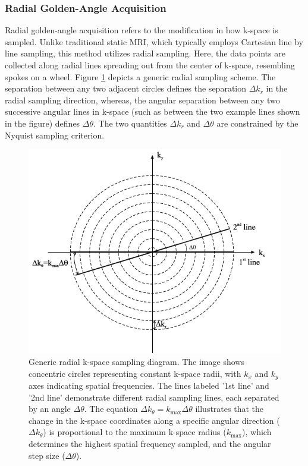\documentclass{micro-econ-thesis}
\begin{document}
\subsubsection{Radial Golden-Angle Acquisition}


Radial golden-angle acquisition refers to the modification in how k-space is sampled. Unlike traditional static MRI, which typically employs Cartesian line by line sampling, this method utilizes radial sampling. Here, the data points are collected along radial lines spreading out from the center of k-space, resembling spokes on a wheel. Figure \ref{fig:radial} depicts a generic radial sampling scheme. The separation between any two adjacent circles defines the separation $\Delta k_r$ in the radial sampling direction, whereas, the angular separation between any two successive angular lines in k-space (such as between the two example lines shown in the figure) defines $\Delta \theta$. The two quantities $\Delta k_r$ and $\Delta \theta$ are constrained by the Nyquist sampling criterion. \parencite{brown_magnetic_2014} 
  
 \begin{figure}[H]
 	\centering
 	\includegraphics[width=0.7\linewidth]{radial}
 	\caption{Generic radial k-space sampling diagram. The image shows concentric circles representing constant k-space radii, with $k_x$ and $k_y$ axes indicating spatial frequencies. The lines labeled '1st line' and '2nd line' demonstrate different radial sampling lines, each separated by an angle $\Delta \theta$. The equation $\Delta k_{\theta} = k_{\text{max}} \Delta \theta$ illustrates that the change in the k-space coordinates along a specific angular direction ($\Delta k_{\theta}$) is proportional to the maximum k-space radius ($k_{\text{max}}$), which determines the highest spatial frequency sampled, and the angular step size ($\Delta \theta$).
 		 \parencite[p.306]{brown_magnetic_2014}}
 	\label{fig:radial}
 \end{figure}
 
\end{document}
